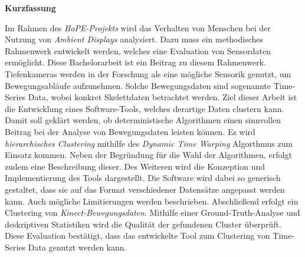\vspace*{2cm}

\begin{center}
    \textbf{Kurzfassung}
\end{center}

\vspace*{1cm}

\noindent
Im Rahmen des \emph{HoPE-Projekts} wird das Verhalten von Menschen
bei der Nutzung von \emph{Ambient Displays} analysiert.
Dazu muss ein methodisches Rahmenwerk entwickelt werden,
welches eine Evaluation von Sensordaten ermöglicht.
Diese Bachelorarbeit ist ein Beitrag zu diesem Rahmenwerk.
Tiefenkameras werden in der Forschung als eine mögliche Sensorik genutzt,
um Bewegungsabläufe aufzunehmen.
Solche Bewegungsdaten sind sogenannte Time-Series Data,
wobei konkret Skelettdaten betrachtet werden.
Ziel dieser Arbeit ist die Entwicklung eines Software-Tools,
welches derartige Daten clustern kann.
Damit soll geklärt werden,
ob deterministische Algorithmen einen sinnvollen Beitrag bei der Analyse von Bewegungsdaten leisten können.
Es wird \emph{hierarchisches Clustering}
mithilfe des \emph{Dynamic Time Warping} Algorthmus zum Einsatz kommen.
Neben der Begründung für die Wahl der Algorithmen,
erfolgt zudem eine Beschreibung dieser.
Des Weiteren wird die Konzeption und Implementierung des Tools dargestellt.
Die Software wird dabei so generisch gestaltet,
dass sie auf das Format verschiedener Datensätze angepasst werden kann.
Auch mögliche Limitierungen werden beschrieben.
Abschließend erfolgt ein Clustering von \emph{Kinect-Bewegungsdaten}.
Mithilfe einer Ground-Truth-Analyse und deskriptiven Statistiken
wird die Qualität der gefundenen Cluster überprüft.
Diese Evaluation bestätigt, dass das entwickelte Tool zum Clustering
von Time-Series Data genutzt werden kann.